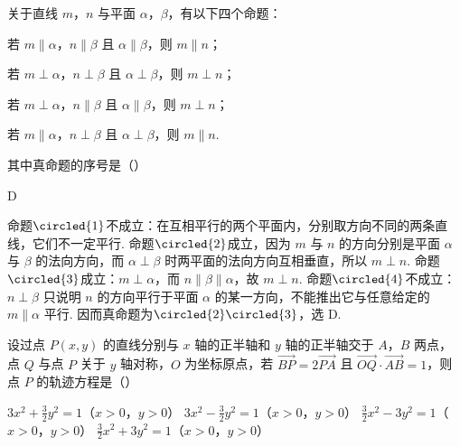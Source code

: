 \begin{problem}
关于直线 \(m\)，\(n\) 与平面 \(\alpha\)，\(\beta\)，有以下四个命题：
\begin{circlelist}
\item 若 \(m \parallel \alpha\)，\(n \parallel \beta\) 且 \(\alpha \parallel \beta\)，则 \(m \parallel n\)；
\item 若 \(m \perp \alpha\)，\(n \perp \beta\) 且 \(\alpha \perp \beta\)，则 \(m \perp n\)；
\item 若 \(m \perp \alpha\)，\(n \parallel \beta\) 且 \(\alpha \parallel \beta\)，则 \(m \perp n\)；
\item 若 \(m \parallel \alpha\)，\(n \perp \beta\) 且 \(\alpha \perp \beta\)，则 \(m \parallel n\).
\end{circlelist}
其中真命题的序号是（\quad）

\choices
    {}
    {}
    {}
    {}
\end{problem}

\begin{answer}
D
\end{answer}

\begin{solution}
命题\(\circled{1}\)不成立：在互相平行的两个平面内，分别取方向不同的两条直线，它们不一定平行. 命题\(\circled{2}\)成立，因为 \(m\) 与 \(n\) 的方向分别是平面 \(\alpha\) 与 \(\beta\) 的法向方向，而 \(\alpha\perp\beta\) 时两平面的法向方向互相垂直，所以 \(m\perp n\). 命题\(\circled{3}\)成立：\(m\perp\alpha\)，而 \(n\parallel\beta\parallel\alpha\)，故 \(m\perp n\). 命题\(\circled{4}\)不成立：\(n\perp\beta\) 只说明 \(n\) 的方向平行于平面 \(\alpha\) 的某一方向，不能推出它与任意给定的 \(m\parallel\alpha\) 平行. 因而真命题为\(\circled{2}\circled{3}\)，选 D.
\end{solution}

\begin{problem}
设过点 \(P(x, y)\) 的直线分别与 \(x\) 轴的正半轴和 \(y\) 轴的正半轴交于 \(A\)，\(B\) 两点，点 \(Q\) 与点 \(P\) 关于 \(y\) 轴对称，\(O\) 为坐标原点，若 \(\overrightarrow{BP} = 2\overrightarrow{PA}\) 且 \(\overrightarrow{OQ} \cdot \overrightarrow{AB} = 1\)，则点 \(P\) 的轨迹方程是（\quad）

\choices
    {\(3x^{2} + \frac{3}{2} y^{2} = 1\)（\(x > 0\)，\(y > 0\)）}
    {\(3x^{2} - \frac{3}{2} y^{2} = 1\)（\(x > 0\)，\(y > 0\)）}
    {\(\frac{3}{2} x^{2} - 3y^{2} = 1\)（\(x > 0\)，\(y > 0\)）}
    {\(\frac{3}{2} x^{2} + 3y^{2} = 1\)（\(x > 0\)，\(y > 0\)）}
\end{problem}

